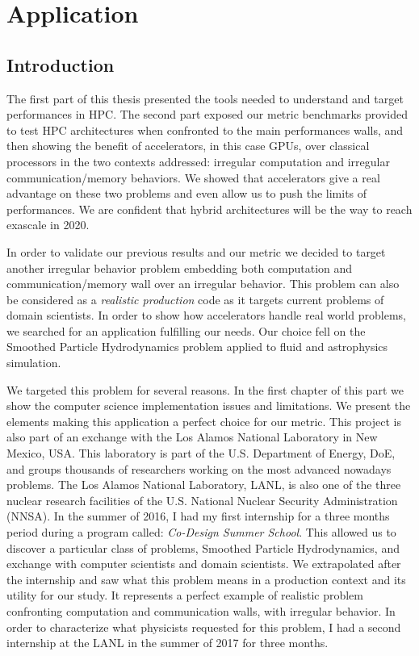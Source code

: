 \part{Application}

\chapter*{Introduction}
The first part of this thesis presented the tools needed to understand and target performances in HPC. 
The second part exposed our metric benchmarks provided to test HPC architectures when confronted to the main performances walls, and then showing the benefit of accelerators, in this case GPUs, over classical processors in the two contexts addressed: irregular computation and irregular communication/memory behaviors.
We showed that accelerators give a real advantage on these two problems and even allow us to push the limits of performances.
We are confident that hybrid architectures will be the way to reach exascale in 2020.

In order to validate our previous results and our metric we decided to target another irregular behavior problem embedding both computation and communication/memory wall over an irregular behavior. 
This problem can also be considered as a \textit{realistic production} code as it targets current problems of domain scientists. 
In order to show how accelerators handle real world problems, we searched for an application fulfilling our needs. 
Our choice fell on the Smoothed Particle Hydrodynamics problem applied to fluid and astrophysics simulation. 

We targeted this problem for several reasons. 
In the first chapter of this part we show the computer science implementation issues and limitations.
We present the elements making this application a perfect choice for our metric.
This project is also part of an exchange with the Los Alamos National Laboratory in New Mexico, USA. 
This laboratory is part of the U.S. Department of Energy, DoE, and groups thousands of researchers working on the most advanced nowadays problems.
The Los Alamos National Laboratory, LANL, is also one of the three nuclear research facilities of the U.S. National Nuclear Security Administration (NNSA). 
In the summer of 2016, I had my first internship for a three months period during a program called: \textit{Co-Design Summer School}.
This allowed us to discover a particular class of problems, Smoothed Particle Hydrodynamics, and exchange with computer scientists and domain scientists.
We extrapolated after the internship and saw what this problem means in a production context and its utility for our study. 
It represents a perfect example of realistic problem confronting computation and communication walls, with irregular behavior. 
In order to characterize what physicists requested for this problem, I had a second internship at the LANL in the summer of 2017 for three months. 

